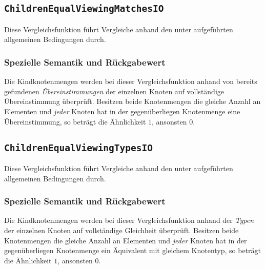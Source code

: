 %
%
\subsection{\texttt{ChildrenEqualViewingMatchesIO}}
Diese Vergleichsfunktion führt Vergleiche anhand den unter  aufgeführten allgemeinen Bedingungen durch.

\subsubsection*{Spezielle Semantik und Rückgabewert}
Die Kindknotenmengen werden bei dieser Vergleichsfunktion anhand von bereits gefundenen \emph{Übereinstimmungen} der einzelnen Knoten auf vollständige Übereinstimmung überprüft. Besitzen beide Knotenmengen die gleiche Anzahl an Elementen und \emph{jeder} Knoten hat in der gegenüberliegen Knotenmenge eine Übereinstimmung, so beträgt die Ähnlichkeit $1$, ansonsten $0$.


\newpage
%
%
\subsection{\texttt{ChildrenEqualViewingTypesIO}}
Diese Vergleichsfunktion führt Vergleiche anhand den unter  aufgeführten allgemeinen Bedingungen durch.

\subsubsection*{Spezielle Semantik und Rückgabewert}
Die Kindknotenmengen werden bei dieser Vergleichsfunktion anhand der \emph{Typen} der einzelnen Knoten auf vollständige Gleichheit überprüft. Besitzen beide Knotenmengen die gleiche Anzahl an Elementen und \emph{jeder} Knoten hat in der gegenüberliegen Knotenmenge ein Äquivalent mit gleichem Knotentyp, so beträgt die Ähnlichkeit $1$, ansonsten $0$.